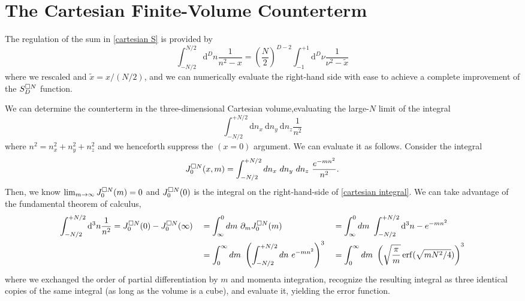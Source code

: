 \section{The Cartesian \Luscher Finite-Volume Counterterm}\label{sec:counterterm/cartesian}

The regulation of the sum in \eqref{cartesian S} is provided by
\begin{equation}
    \int_{-N/2}^{N/2} \mathrm{d}^Dn \frac{1}{n^2-x}
    =
    \left(\frac{N}{2}\right)^{D-2} \int_{-1}^{+1} \mathrm{d}^D\nu \frac{1}{\nu^2 - \tilde{x}}
\end{equation}
where we rescaled and $\tilde{x}=x/(N/2)$, and we can numerically evaluate the right-hand side with ease to achieve a complete improvement of the $S_D^{\square N}$ function.

We can determine the counterterm in the three-dimensional Cartesian volume,evaluating the large-$N$ limit of the integral
\begin{equation}\label{eq:cartesian integral}
    \int_{-N/2}^{+N/2} \mathrm{d}n_x\ \mathrm{d}n_y\ \mathrm{d}n_z \frac{1}{n^2}
\end{equation}
where $n^2 = n_x^2+n_y^2+n_z^2$ and we henceforth suppress the $(x=0)$ argument.
We can evaluate it as follows.  Consider the integral
\begin{equation}
	J^{\square N}_0(x, m) = \int_{-N/2}^{+N/2} dn_x\ dn_y\ dn_z\ \frac{e^{-m n^2}}{n^2}.
\end{equation}
Then, we know $\lim_{m\rightarrow\infty} J^{\square N}_0(m) = 0$ and $J^{\square N}_0(0)$ is the integral on the right-hand-side of \eqref{cartesian integral}.
We can take advantage of the fundamental theorem of calculus,
\begin{align}
	\int_{-N/2}^{+N/2} \mathrm{d}^3n \frac{1}{n^2}
    &=
    J^{\square N}_0(0) - J^{\square N}_0(\infty)
		&&= 	\int_{\infty}^{0} dm\ \partial_m J^{\square N}_0(m)
		&&=	\int_{\infty}^{0} dm\ \int_{-N/2}^{+N/2} \mathrm{d}^3n -e^{-m n^2}
		\nonumber\\
		&&&=	\int_0^\infty dm\ \left(\int_{-N/2}^{+N/2} dn\ e^{-m n^2}\right)^3
		&&=	\int_0^\infty dm\ \left(\sqrt{\frac{\pi}{m}} \operatorname{erf}(\sqrt{m N^2/4})\right)^3
\end{align}
where we exchanged the order of partial differentiation by $m$ and momenta integration, recognize the resulting integral as three identical copies of the same integral (as long as the volume is a cube), and evaluate it, yielding the error function.
